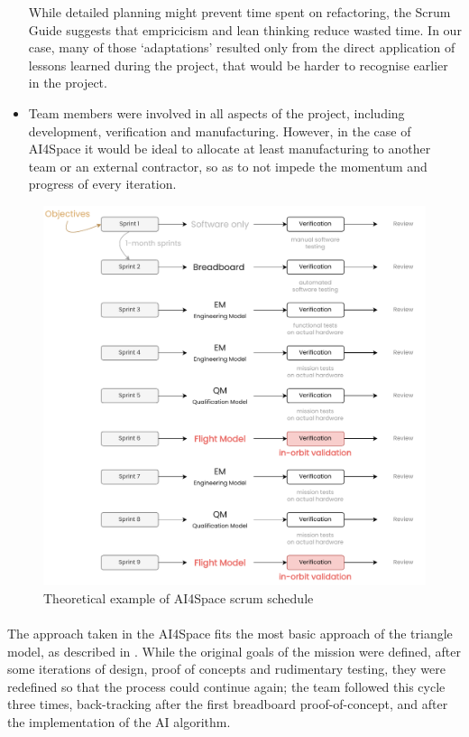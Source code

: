 \documentclass[]{iac}
\begin{document}
\begin{itemize}[itemsep=0pt]
    While detailed planning might prevent time spent on refactoring, the Scrum Guide \autocite{schwaver_definitive_2020} suggests that empricicism and lean thinking reduce wasted time. In our case, many of those `adaptations' resulted only from the direct application of lessons learned during the project, that would be harder to recognise earlier in the project.
    \item Team members were involved in all aspects of the project, including development, verification and manufacturing. However, in the case of AI4Space it would be ideal to allocate at least manufacturing to another team or an external contractor, so as to not impede the momentum and progress of every iteration.
\end{itemize}

\begin{figure}[]
    \centering
    \includegraphics[width=\linewidth]{media/AI4SpaceImaginary.drawio.pdf}
    \caption{Theoretical example of AI4Space scrum schedule}
    \label{fig:theoretical_ai4space}
\end{figure}

\paragraph{}
The approach taken in the AI4Space fits the most basic approach of the triangle model, as described in . While the original goals of the mission were defined, after some iterations of design, proof of concepts and rudimentary testing, they were redefined so that the process could continue again; the team followed this cycle three times, back-tracking after the first breadboard proof-of-concept, and after the implementation of the AI algorithm.
\end{document}

